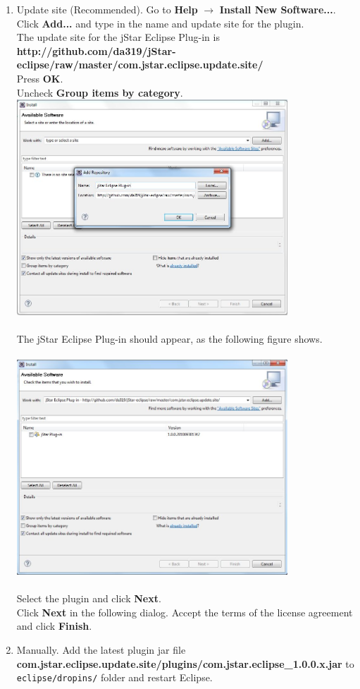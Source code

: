 \documentclass{article}
\begin{document}
\begin{enumerate}
\item Update site (Recommended). Go to {\bf  Help} $\rightarrow$ {\bf Install New Software...}. Click {\bf Add...}  and type in the name and update site for the plugin. \\ The update site for the jStar Eclipse Plug-in is \\ {\bf http://github.com/da319/jStar-eclipse/raw/master/com.jstar.eclipse.update.site/}\\
Press {\bf OK}.\\
Uncheck {\bf Group items by category}.\\
\includegraphics[width=4in]{images/updateSite1.jpg}\\\\
The jStar Eclipse Plug-in should appear, as the following figure shows.\\\\
\includegraphics[width=4in]{images/updateSite2.jpg}\\\\
Select the plugin and click {\bf Next}.\\
Click {\bf Next} in the following dialog.
Accept the terms of the license agreement and click {\bf Finish}.
\item Manually. Add the latest plugin jar file\\ \textbf{com.jstar.eclipse.update.site/plugins/com.jstar.eclipse\_1.0.0.x.jar} to \texttt{eclipse/dropins/} folder and restart Eclipse.
\end{enumerate}
\end{document}

